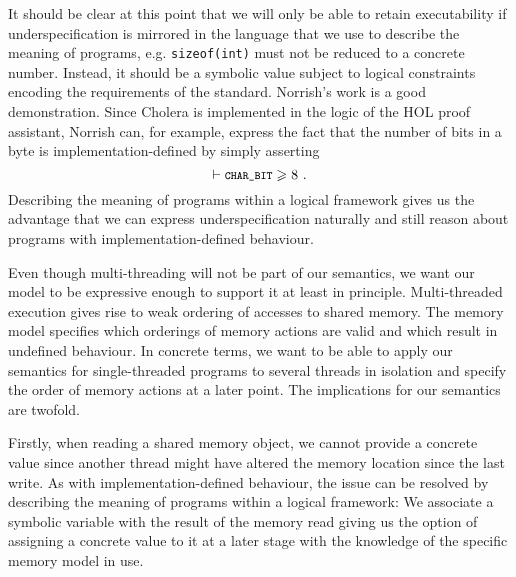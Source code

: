 \documentclass[a4paper,12pt]{scrbook}
\theoremstyle{plain}
\theoremstyle{definition}
\renewcommand{\geq}{\geqslant}
\newcommand{\name}[1]{\textsf{#1}}
\newcommand{\cc}[1]{{\text{\footnotesize\ttfamily{#1}}}}
\begin{document}
It should be clear at this point that we will only be able to retain
executability if underspecification is mirrored in the language that we use to
describe the meaning of programs, e.g. \lstinline{sizeof(int)} must not be
reduced to a concrete number. Instead, it should be a symbolic value subject to
logical constraints encoding the requirements of the standard. Norrish's work is
a good demonstration. Since \name{Cholera} is implemented in the logic of the
HOL proof assistant, Norrish \cite[p. 30]{norrishPhd} can, for example, express
the fact that the number of bits in a byte is implementation-defined by simply
asserting
\begin{equation*}
\vdash \cc{CHAR\_BIT} \geq 8 ~.
\end{equation*}
Describing the meaning of programs within a logical framework gives us the
advantage that we can express underspecification naturally and still reason
about programs with implementation-defined behaviour.


Even though multi-threading will not be part of our semantics, we want our model
to be expressive enough to support it at least in principle. Multi-threaded
execution gives rise to weak ordering of accesses to shared memory. The memory
model specifies which orderings of memory actions are valid and which result in
undefined behaviour.
In concrete terms, we want to be able to apply our semantics for single-threaded
programs to several threads in isolation and specify the order of memory actions
at a later point.
The implications for our semantics are twofold.

Firstly, when reading a shared memory object, we cannot provide a concrete value
since another thread might have altered the memory location since the last
write. As with implementation-defined behaviour, the issue can be resolved by
describing the meaning of programs within a logical framework: We associate a
symbolic variable with the result of the memory read giving us the option of
assigning a concrete value to it at a later stage with the knowledge of the
specific memory model in use.
\end{document}
